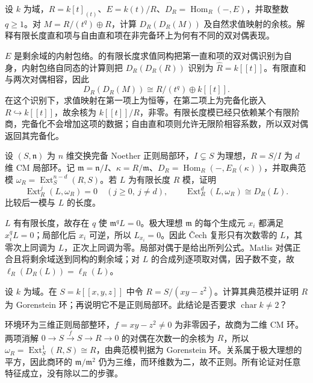 \begin{optionalexercise}\label{b3:ex:22-completion-in-double-dual}
	设 \(k\) 为域，\(R=k[t]_{(t)}\)、\(E=k(t)/R\)、\(D_R=\operatorname{Hom}_R(-,E)\)，并取整数 \(q\ge1\)。对 \(M=R/(t^q)\oplus R\)，计算 \(D_R(D_R(M))\) 及自然求值映射的余核。解释有限长度直和项与自由直和项在非完备环上为何有不同的双对偶表现。
\end{optionalexercise}
\begin{solution}
	\(E\) 是剩余域的内射包络。的有限长度求值同构把第一直和项的双对偶识别为自身，内射包络自同态的计算则把 \(D_R(D_R(R))\) 识别为 \(\widehat R=k[\![t]\!]\)。有限直和与两次对偶相容，因此
	\[
		D_R(D_R(M))\cong R/(t^q)\oplus k[\![t]\!].
	\]
	在这个识别下，求值映射在第一项上为恒等，在第二项上为完备化嵌入 \(R\hookrightarrow k[\![t]\!]\)，故余核为 \(k[\![t]\!]/R\)，非零。有限长度模已经只依赖某个有限阶商，完备化不会增加这项的数据；自由直和项则允许无限阶相容系数，所以双对偶返回其完备化。
\end{solution}

\begin{optionalexercise}\label{b3:ex:22-finite-length-local-duality}
	设 \((S,\mathfrak n)\) 为 \(n\) 维交换完备 Noether 正则局部环，\(I\subsetneq S\) 为理想，\(R=S/I\) 为 \(d\) 维 CM 局部环。记 \(\mathfrak m=\mathfrak n/I\)、\(\kappa=R/\mathfrak m\)、\(D_R=\operatorname{Hom}_R(-,E_R(\kappa))\)，并取典范模 \(\omega_R=\operatorname{Ext}_S^{n-d}(R,S)\)。若 \(L\) 为有限长度 \(R\) 模，证明
	\[
		\operatorname{Ext}_R^j(L,\omega_R)=0\quad(j\ge0,\ j\ne d),\qquad \operatorname{Ext}_R^d(L,\omega_R)\cong D_R(L).
	\]
	比较后一模与 \(L\) 的长度。
\end{optionalexercise}
\begin{solution}
	\(L\) 有有限长度，故存在 \(q\) 使 \(\mathfrak m^qL=0\)。极大理想 \(\mathfrak m\) 的每个生成元 \(x_i\) 都满足 \(x_i^qL=0\)；局部化后 \(x_i\) 可逆，所以 \(L_{x_i}=0\)。因此 Čech 复形只有次数零的 \(L\)，其零次上同调为 \(L\)，正次上同调为零。局部对偶于是给出所列公式。Matlis 对偶正合且将剩余域送到同构的剩余域；对 \(L\) 的合成列逐项取对偶，因子数不变，故 \(\ell_R(D_R(L))=\ell_R(L)\)。
\end{solution}

\begin{optionalexercise}\label{b3:ex:22-quadric-canonical}
	设 \(k\) 为域。在 \(S=k[\![x,y,z]\!]\) 中令 \(R=S/(xy-z^2)\)。计算其典范模并证明 \(R\) 为 Gorenstein 环；再说明它不是正则局部环。此结论是否要求 \(\operatorname{char}k\ne2\)？
\end{optionalexercise}
\begin{solution}
	环境环为三维正则局部整环，\(f=xy-z^2\ne0\) 为非零因子，故商为二维 CM 环。两项消解 \(0\to S\xrightarrow{f}S\to R\to0\) 的对偶在次数一的余核为 \(R\)，所以 \(\omega_R=\operatorname{Ext}_S^1(R,S)\cong R\)，由典范模判据为 Gorenstein 环。关系属于极大理想的平方，因此商环的 \(\mathfrak m/\mathfrak m^2\) 仍为三维，而环维数为二，故不正则。所有论证对任意特征成立，没有除以二的步骤。
\end{solution}

